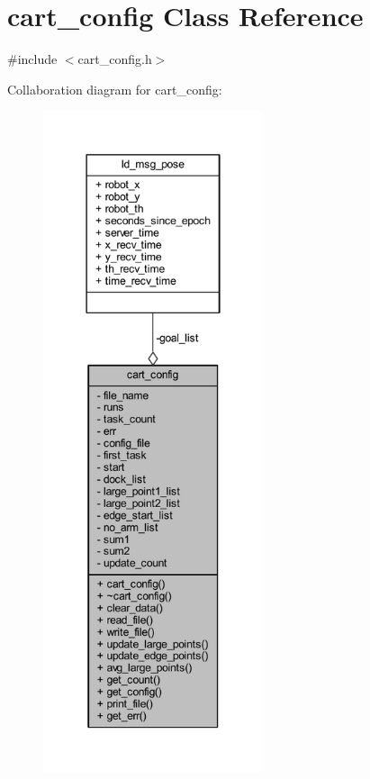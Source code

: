 \hypertarget{classcart__config}{}\section{cart\+\_\+config Class Reference}
\label{classcart__config}


{\ttfamily \#include $<$cart\+\_\+config.\+h$>$}



Collaboration diagram for cart\+\_\+config\+:\nopagebreak
\begin{figure}[H]
\begin{center}
\leavevmode
\includegraphics[height=550pt]{classcart__config__coll__graph}
\end{center}
\end{figure}
